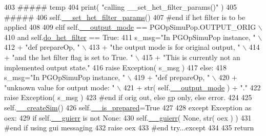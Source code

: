 \begin{DoxyCode}
403                     \textcolor{comment}{##### temp}
404                     print( \textcolor{stringliteral}{"calling \_\_set\_het\_filter\_params()"} )
405                     \textcolor{comment}{#####}
406                     self.\hyperlink{classnegui_1_1pgopsimupop_1_1PGOpSimuPop_a65b265c88ad030a37c015926d71491b3}{\_\_set\_het\_filter\_params}()
407                 \textcolor{comment}{#end if het filter is to be applied}
408 
409             \textcolor{keywordflow}{elif} self.\hyperlink{classnegui_1_1pgopsimupop_1_1PGOpSimuPop_abac5c621286b240967702ca9cd23dddf}{\_\_output\_mode} == PGOpSimuPop.OUTPUT\_ORIG \(\backslash\)
410                                     \textcolor{keywordflow}{and} self.\hyperlink{classnegui_1_1pgopsimupop_1_1PGOpSimuPop_ad2b799d9a55e531707e792905d97b452}{do\_het\_filter} == \textcolor{keyword}{True}:
411                 s\_msg=\textcolor{stringliteral}{"In PGOpSimuPop instance, "} \(\backslash\)
412                         + \textcolor{stringliteral}{"def prepareOp, "} \(\backslash\)
413                         + \textcolor{stringliteral}{"the output mode is for original output, "} \(\backslash\)
414                         + \textcolor{stringliteral}{"and the het filter flag is set to True.  "} \(\backslash\)
415                         + \textcolor{stringliteral}{"This is currently not an implemented output state."}
416                 \textcolor{keywordflow}{raise} Exception( s\_msg )
417             \textcolor{keywordflow}{else}:
418                 s\_msg=\textcolor{stringliteral}{"In PGOpSimuPop instance, "} \(\backslash\)
419                         + \textcolor{stringliteral}{"def prepareOp, "} \(\backslash\)
420                         + \textcolor{stringliteral}{"unknown value for output mode: "} \(\backslash\)
421                         + str( self.\hyperlink{classnegui_1_1pgopsimupop_1_1PGOpSimuPop_abac5c621286b240967702ca9cd23dddf}{\_\_output\_mode} ) + \textcolor{stringliteral}{"."}
422                 \textcolor{keywordflow}{raise} Exception( s\_msg )
423             \textcolor{comment}{#end if orig out, else gp only, else error.}
424 
425             self.\hyperlink{classnegui_1_1pgopsimupop_1_1PGOpSimuPop_a49e5124b6d2395ede0b0ba4915f6315f}{\_\_createSim}()
426             self.\hyperlink{classnegui_1_1pgopsimupop_1_1PGOpSimuPop_ac10f21f990f51e85c7fab2b5aa888edd}{\_\_is\_prepared}=\textcolor{keyword}{True}
427 
428         \textcolor{keywordflow}{except} Exception \textcolor{keyword}{as} oex:
429             \textcolor{keywordflow}{if} self.\hyperlink{classnegui_1_1pgopsimupop_1_1PGOpSimuPop_a03370ae1435e2f26d672cd66a876b43c}{\_\_guierr} \textcolor{keywordflow}{is} \textcolor{keywordflow}{not} \textcolor{keywordtype}{None}:
430                 self.\hyperlink{classnegui_1_1pgopsimupop_1_1PGOpSimuPop_a03370ae1435e2f26d672cd66a876b43c}{\_\_guierr}( \textcolor{keywordtype}{None}, str( oex ) )
431             \textcolor{comment}{#end if using gui messaging}
432             \textcolor{keywordflow}{raise} oex
433         \textcolor{comment}{#end try...except}
434 
435         \textcolor{keywordflow}{return}
\end{DoxyCode}


